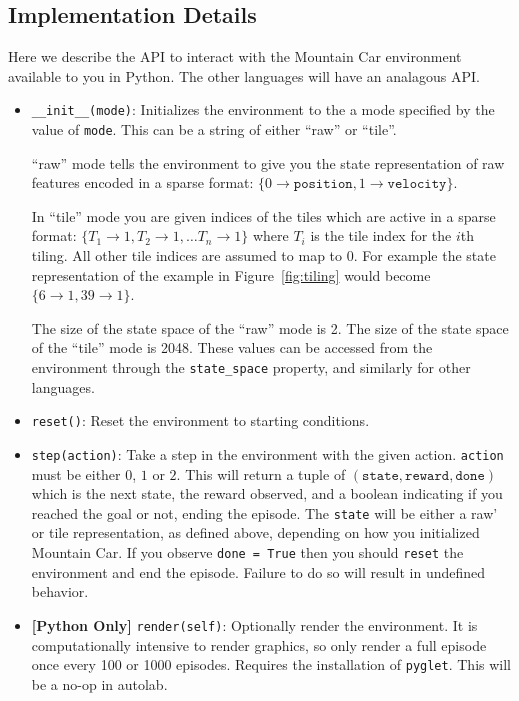 \documentclass[11pt]{article}
\numberwithin{equation}{section} %
\numberwithin{figure}{section} %
\numberwithin{table}{section} %
\begin{document}
\subsection{Implementation Details}
Here we describe the API to interact with the Mountain Car environment available to you in Python. The other languages will have an analagous API.

\begin{itemize}
    \item \texttt{\_\_init\_\_(mode)}: Initializes the environment to the a mode specified by the value of \texttt{mode}. This can be a string of either ``raw'' or ``tile''. 
    
    ``raw'' mode tells the environment to give you the state representation of raw features encoded in a sparse format: $\{0 \rightarrow \texttt{position}, 1 \rightarrow \texttt{velocity}\}$.
    
    In ``tile'' mode you are given indices of the tiles which are active in a sparse format: $\{T_1 \rightarrow 1, T_2 \rightarrow 1, \ldots T_n \rightarrow 1\}$ where $T_i$ is the tile index for the $i$th tiling. All other tile indices are assumed to map to 0. For example the state representation of the example in Figure~\ref{fig:tiling} would become $\{6 \rightarrow 1, 39 \rightarrow 1\}$.
    
    The size of the state space of the ``raw'' mode is 2. The size of the state space of the ``tile'' mode is 2048. These values can be accessed from the environment through the \texttt{state\_space} property, and similarly for other languages.
    \item \texttt{reset()}: Reset the environment to starting conditions.
    \item \texttt{step(action)}: Take a step in the environment with the given action. \texttt{action} must be either $0$, $1$ or $2$. This will return a tuple of $(\texttt{state}, \texttt{reward}, \texttt{done})$ which is the next state, the reward observed, and a boolean indicating if you reached the goal or not, ending the episode. The \texttt{state} will be either a raw' or tile representation, as defined above, depending on how you initialized Mountain Car.  If you observe \texttt{done = True} then you should \texttt{reset} the environment and end the episode. Failure to do so will result in undefined behavior.
    \item \textbf{[Python Only]} \texttt{render(self)}: Optionally render the environment. It is computationally intensive to render graphics, so only render a full episode once every 100 or 1000 episodes. Requires the installation of \texttt{pyglet}. This will be a no-op in autolab.
\end{itemize}
\end{document}
